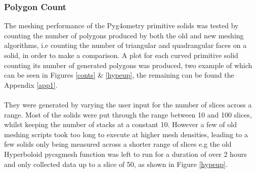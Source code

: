 \documentclass[12pt,a4paper]{article}
\begin{document}
\subsubsection{Polygon Count}
The meshing performance of the Pyg4ometry primitive solids was tested by counting the number of polygons produced by both the old and new meshing algorithms, i.e counting the number of triangular and quadrangular faces on a solid, in order to make a comparison. A plot for each curved primitive solid counting its number of generated polygons was produced, two example of which can be seen in Figures \ref{conts} \& \ref{hypeup}, the remaining can be found the Appendix \ref{app1}.
\\\\
They were generated by varying the user input for the number of slices across a range. Most of the solids were put through the range between 10 and 100 slices, whilst keeping the number of stacks at a constant 10. However a few of old meshing scripts took too long to execute at higher mesh densities, leading to a few solids only being measured across a shorter range of slices e.g the old Hyperboloid pycsgmesh function was left to run for a duration of over 2 hours and only collected data up to a slice of 50, as shown in Figure \ref{hypeup}.  \\
\end{document}
